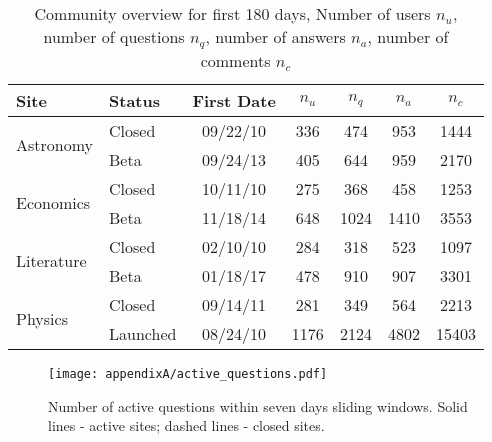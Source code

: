 \begin{table}[h]
	\centering
	\caption[Community overview for first 180 days.]{Community overview for first 180 days, Number of users $n_u$, number of questions $n_q$, number of answers $n_a$, number of comments $n_c$}
	\label{tab:site-info}
	\begin{tabular}{llccccc}
		\toprule
		Site                 & Status                           & First Date                     & $n_u$                    & $n_q$                & $n_a$                  & $n_c$ \\ \hline
		\multirow{2}{*}{Astronomy}  & \multicolumn{1}{l|}{Closed}      & \multicolumn{1}{c|}{09/22/10} & \multicolumn{1}{c|}{336}  & \multicolumn{1}{c|}{474}  & \multicolumn{1}{c|}{953}  & 1444     \\
		& \multicolumn{1}{l|}{Beta} & \multicolumn{1}{c|}{09/24/13} & \multicolumn{1}{c|}{405}  & \multicolumn{1}{c|}{644}  & \multicolumn{1}{c|}{959}  & 2170     \\ \hline
		\multirow{2}{*}{Economics}  & \multicolumn{1}{l|}{Closed}      & \multicolumn{1}{c|}{10/11/10} & \multicolumn{1}{c|}{275}  & \multicolumn{1}{c|}{368}  & \multicolumn{1}{c|}{458}  & 1253     \\
		& \multicolumn{1}{l|}{Beta} & \multicolumn{1}{c|}{11/18/14} & \multicolumn{1}{c|}{648}  & \multicolumn{1}{c|}{1024} & \multicolumn{1}{c|}{1410} & 3553     \\ \hline
		\multirow{2}{*}{Literature} & \multicolumn{1}{l|}{Closed}      & \multicolumn{1}{c|}{02/10/10} & \multicolumn{1}{c|}{284}  & \multicolumn{1}{c|}{318}  & \multicolumn{1}{c|}{523}  & 1097     \\
		& \multicolumn{1}{l|}{Beta} & \multicolumn{1}{c|}{01/18/17} & \multicolumn{1}{c|}{478}  & \multicolumn{1}{c|}{910}  & \multicolumn{1}{c|}{907}  & 3301     \\ \hline
		\multirow{2}{*}{Physics}    & \multicolumn{1}{l|}{Closed}      & \multicolumn{1}{c|}{09/14/11} & \multicolumn{1}{c|}{281}  & \multicolumn{1}{c|}{349}  & \multicolumn{1}{c|}{564}  & 2213     \\
		& \multicolumn{1}{l|}{Launched}    & \multicolumn{1}{c|}{08/24/10} & \multicolumn{1}{c|}{1176} & \multicolumn{1}{c|}{2124} & \multicolumn{1}{c|}{4802} & 15403    \\
		\bottomrule
	\end{tabular}
\end{table}


\begin{figure}
	\centering
	\texttt{[image: appendixA/active\_questions.pdf]}
	\caption[Number of active questions within seven days sliding windows]{Number of active questions within seven days sliding windows. Solid lines - active sites; dashed lines - closed sites.}
	\label{fig:active_questions}
\end{figure}

